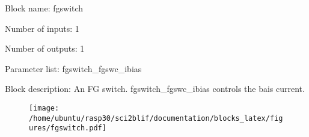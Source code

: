 \pagebreak

Block name: fgswitch

Number of inputs: 1

Number of outputs: 1

Parameter list: fgswitch\_fgswc\_ibias

Block description: 
An FG switch. fgswitch\_fgswc\_ibias controls the bais current.

\begin{figure}[H]  %
\texttt{[image: /home/ubuntu/rasp30/sci2blif/documentation/blocks\_latex/figures/fgswitch.pdf]}
\end{figure}

